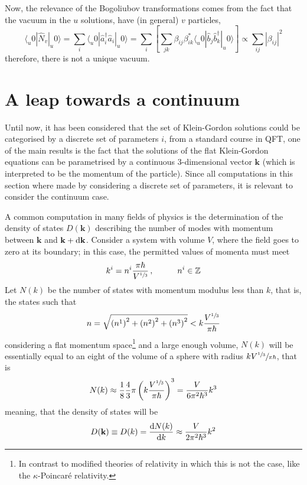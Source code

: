 Now, the relevance of the Bogoliubov transformations comes from the fact that the vacuum in the $u$ solutions, have (in general) $v$ particles,
\begin{equation}
	\langle_u0|\hat{N}_v|_u0\rangle=\sum_i\langle_u0|\hat{a}_i^\dagger\hat{a}_i|_u0\rangle=\sum_{i}\left[\sum_{jk}\beta_{ij}\beta^*_{ik}\langle_u0|\hat{b}_j\hat{b}_k^\dagger|_u0\rangle\right]\propto \sum_{ij}|\beta_{ij}|^2
\end{equation}
therefore, there is not a unique vacuum.

\section{A leap towards a continuum}
Until now, it has been considered that the set of Klein-Gordon solutions could be categorised by a discrete set of parameters $i$, from a standard course in QFT, one of the main results is the fact that the solutions of the flat Klein-Gordon equations can be parametrised by a continuous $3$-dimensional vector $\mathbf{k}$ (which is interpreted to be the momentum of the particle). Since all computations in this section where made by considering a discrete set of parameters, it is relevant to consider the continuum case.

A common computation in many fields of physics is the determination of the density of states $D(\mathbf{k})$ describing the number of modes with momentum between $\mathbf{k}$ and $\mathbf{k}+\text{d} \mathbf{k}$. Consider a system with volume $V$, where the field goes to zero at its boundary; in this case, the permitted values of momenta must meet
\begin{equation}
	k^i=n^i\frac{\pi\hbar}{V^{\sfrac{1}{3}}}\,,\hspace{1.0cm}n^i\in\mathbb{Z}
\end{equation}
Let $N(k)$ be the number of states with momentum modulus less than $k$, that is, the states such that
\begin{equation}
	n=\sqrt{\left(n^1\right)^2+\left(n^2\right)^2+\left(n^3\right)^2}<k\frac{V^{\sfrac{1}{3}}}{\pi\hbar}
\end{equation}
considering a flat momentum space\footnote{In contrast to modified theories of relativity in which this is not the case, like the $\kappa$-Poincaré relativity.} and a large enough volume, $N(k)$ will be essentially equal to an eight of the volume of a sphere with radius $kV^{\sfrac{1}{3}}\sfrac{}{\pi\hbar}$, that is
\begin{equation}
	N(k)\approx\frac{1}{8}\frac{4}{3}\pi\left(k\frac{V^{\sfrac{1}{3}}}{\pi\hbar}\right)^3=\frac{V}{6\pi^2\hbar^3}k^3
\end{equation} 
meaning, that the density of states will be
\begin{equation}
	D(\mathbf{k})\equiv D(k)=\frac{\text{d} N(k)}{\text{d} k}\approx\frac{V}{2\pi^2\hbar^3}k^2
\end{equation}

